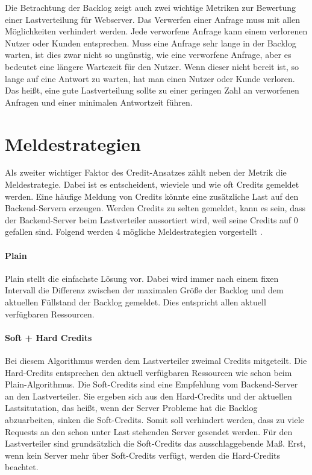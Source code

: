 \documentclass[a4paper, 12pt, BCOR10mm, DIV12, toc=bibliography, toc=listof, german]{scrbook}
\begin{document}
			Die Betrachtung der Backlog zeigt auch zwei wichtige Metriken zur Bewertung einer Lastverteilung
			für Webserver. Das Verwerfen einer Anfrage muss mit allen Möglichkeiten verhindert werden. Jede
			verworfene Anfrage kann einem verlorenen Nutzer oder Kunden entsprechen. Muss eine Anfrage sehr
			lange in der Backlog warten, ist dies zwar nicht so ungünstig, wie eine verworfene Anfrage, aber
			es bedeutet eine längere Wartezeit für den Nutzer. Wenn dieser nicht bereit ist, so lange auf eine
			Antwort zu warten, hat man einen Nutzer oder Kunde verloren. Das heißt, eine gute
			Lastverteilung sollte zu einer geringen Zahl an verworfenen Anfragen und einer minimalen
			Antwortzeit führen.


		\section{Meldestrategien} %
		\label{sec:meldestrategien}

			Als zweiter wichtiger Faktor des Credit-Ansatzes zählt neben der Metrik die Meldestrategie. Dabei
			ist es entscheident, wieviele und wie oft Credits gemeldet werden. Eine häufige Meldung von Credits
			könnte eine zusätzliche Last auf den Backend-Servern erzeugen. Werden Credits zu selten
			gemeldet,
			kann es sein, dass der Backend-Server beim Lastverteiler aussortiert wird, weil seine Credits auf
			0 gefallen sind. Folgend werden 4 mögliche Meldestrategien vorgestellt \cite{scsczile2008, schneidenbach2009}.

			\paragraph{Plain} %
			\label{par:plain}

				Plain stellt die einfachste Lösung vor. Dabei wird immer nach einem fixen Intervall die
				Differenz zwischen der maximalen Größe der Backlog und dem aktuellen Füllstand der Backlog
				gemeldet. Dies entspricht allen aktuell verfügbaren Ressourcen.


			\paragraph{Soft + Hard Credits} %
			\label{par:soft-hard-credits}

			Bei diesem Algorithmus werden dem Lastverteiler zweimal Credits mitgeteilt. Die Hard-Credits
			entsprechen den aktuell verfügbaren Ressourcen wie schon beim Plain-Algorithmus. Die Soft-Credits
			sind eine Empfehlung vom Backend-Server an den Lastverteiler. Sie ergeben sich aus den
			Hard-Credits und der aktuellen Lastsitutation, das heißt, wenn der Server Probleme hat die Backlog
			abzuarbeiten, sinken die Soft-Credits. Somit soll verhindert werden, dass zu viele Requests an den
			schon unter Last stehenden Server gesendet werden. Für den Lastverteiler sind grundsätzlich die
			Soft-Credits das ausschlaggebende Maß. Erst, wenn kein Server mehr über Soft-Credits verfügt,
			werden die Hard-Credits beachtet.
\end{document}
